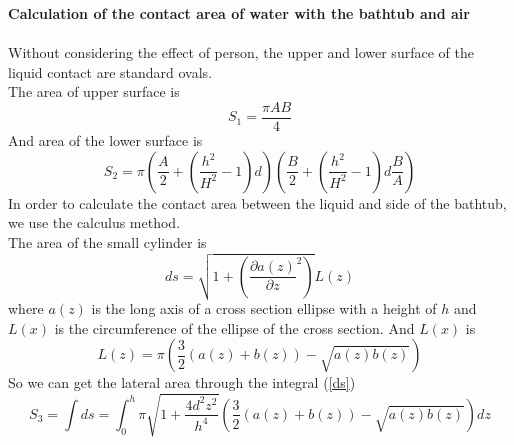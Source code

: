 \documentclass{mcmthesis}
\begin{document}
\textbf{Calculation of the contact area of water with the bathtub and air} \\\\
\indent Without considering the effect of person, the upper and lower surface of the liquid contact are standard ovals.\\
\indent The area of upper surface is\\
\begin{equation}
S_{1}=\frac{\pi AB}{4}
\end{equation}
\indent And area of the lower surface is\\
\begin{equation}
	S_{2}=\pi (\frac{A}{2}+(\frac{h^{2}}{H^{2}}-1)d)(\frac{B}{2}+(\frac{h^{2}}{H^{2}}-1)d\frac{B}{A})
\end{equation}
\indent In order to calculate the contact area between the liquid and side of the bathtub, we use the calculus method.\\
\indent The area of the small cylinder is 
\begin{equation}
ds=\sqrt{1+(\frac{\partial a(z)}{\partial z}^{2})} L(z)
\label{ds}
\end{equation}
\indent where $a(z)$ is the long axis of a cross section ellipse with a height of $h$ and $L(x)$ is the circumference of the ellipse of the cross section. And $L(x)$ is
\begin{equation}
L(z)=\pi (\frac{3}{2}(a(z)+b(z))-\sqrt{a(z)b(z)})
\end{equation} 
\indent So we can get the lateral area through the integral (\ref{ds})
\begin{equation}
	S_{3}=\int ds=\int_{0}^{h}\pi \sqrt{1+\frac{4d^{2}z^{2}}{h^{4}}}(\frac{3}{2}(a(z)+b(z))-\sqrt{a(z)b(z)})dz
\end{equation}
\end{document}

